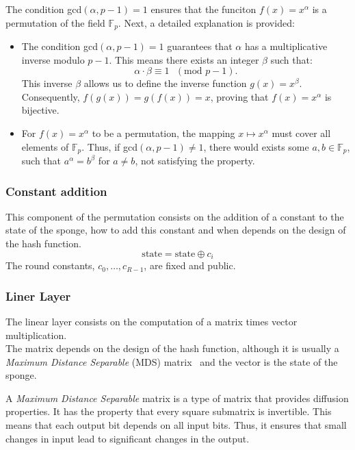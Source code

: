 The condition gcd$(\alpha,p-1)=1$ ensures that the funciton $f(x)=x^\alpha$ is a permutation of the field $\mathbb{F}_p$. Next, a detailed explanation is provided:
\begin{itemize}
    \item The condition gcd$(\alpha,p-1)=1$ guarantees that $\alpha$ has a multiplicative inverse modulo $p-1$. This means there exists an integer $\beta$ such that:
    \begin{equation}
        \alpha\cdot\beta\equiv1\text{ }(\text{mod }p-1).
    \end{equation}
    This inverse $\beta$ allows us to define the inverse function $g(x)=x^\beta$. Consequently, $f(g(x))=g(f(x))=x$, proving that $f(x)=x^\alpha$ is bijective.
    \item For $f(x)=x^\alpha$ to be a permutation, the mapping $x\mapsto x^\alpha$ must cover all elements of $\mathbb{F}_p$. Thus, if gcd$(\alpha,p-1)\neq1$, there would exists some $a,b\in\mathbb{F}_p$, such that $a^\alpha=b^\beta$ for $a\neq b$, not satisfying the property. 
\end{itemize}

\subsubsection*{Constant addition}
This component of the permutation consists on the addition of a constant to the state of the sponge, how to add this constant and when depends on the design of the hash function.
\begin{equation}
    \text{state}=\text{state}\oplus c_i
\end{equation}
The round constants, $c_0,\dots,c_{R-1}$, are fixed and public.

\subsubsection*{Liner Layer}
The linear layer consists on the computation of a matrix times vector multiplication.\\ The matrix depends on the design of the hash function, although it is usually a \textit{Maximum Distance Separable} (MDS) matrix~\cite{duval2018mds} and the vector is the state of the sponge.

A \textit{Maximum Distance Separable} matrix is a type of matrix that provides diffusion properties. It has the property that every square submatrix is invertible. This means that each output bit depends on all input bits. Thus, it ensures that small changes in input lead to significant changes in the output.

